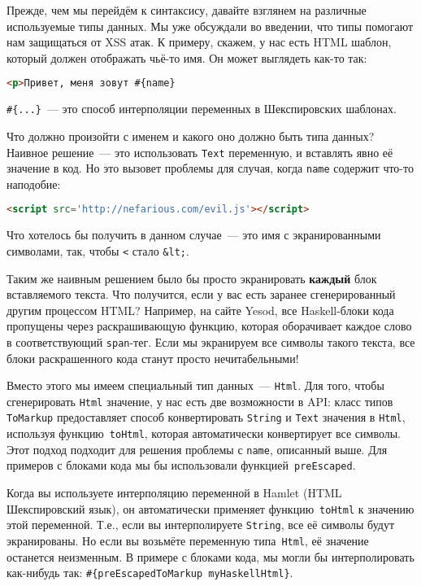 Прежде, чем мы перейдём к синтаксису, давайте взглянем на различные
используемые типы данных. Мы уже обсуждали во введении, что типы помогают нам
защищаться от XSS атак. К примеру, скажем, у нас есть HTML шаблон, который
должен отображать чьё-то имя. Он может выглядеть как-то так:

\begin{lstlisting}[language=HTML]
<p>Привет, меня зовут #{name}
\end{lstlisting}

\begin{remark}
    \lstinline'#{...}'~--- это способ интерполяции переменных в Шекспировских
    шаблонах.
\end{remark}

Что должно произойти с именем и какого оно должно быть типа данных?  Наивное
решение~--- это использовать \lstinline'Text' переменную, и вставлять явно её
значение в код.  Но это вызовет проблемы для случая, когда 
\lstinline'name' содержит что-то наподобие:
\begin{lstlisting}[language=HTML]
<script src='http://nefarious.com/evil.js'></script>
\end{lstlisting}
Что хотелось бы получить в данном случае~--- это имя с экранированными
символами, так, чтобы \lstinline'<' стало \lstinline'&lt;'.

Таким же наивным решением было бы просто экранировать \textbf{каждый} блок
вставляемого текста. Что получится, если у вас есть заранее сгенерированный
другим процессом HTML? Например, на сайте Yesod, все Haskell-блоки кода
пропущены через раскрашивающую функцию, которая оборачивает каждое слово в
соответствующий \texttt{span}-тег. Если мы экранируем все символы такого
текста, все блоки раскрашенного кода станут просто нечитабельными!

Вместо этого мы имеем специальный тип данных~--- \lstinline'Html'. Для того,
чтобы сгенерировать \lstinline'Html' значение, у нас есть две возможности в
API: класс типов \lstinline'ToMarkup' предоставляет способ конвертировать
\lstinline'String' и \lstinline'Text' значения в \lstinline'Html', используя
функцию~\lstinline'toHtml', которая автоматически конвертирует все символы.
Этот подход подходит для решения проблемы с \texttt{name}, описанный выше. Для
примеров с блоками кода мы бы использовали функцией~\lstinline'preEscaped'.

Когда вы используете интерполяцию переменной в Hamlet (HTML Шекспировский
язык), он автоматически применяет функцию~\lstinline'toHtml' к значению этой
переменной. Т.е., если вы интерполируете \lstinline'String', все её символы
будут экранированы. Но если вы возьмёте переменную типа~\lstinline'Html', её
значение останется неизменным. В примере с блоками кода, мы могли бы
интерполировать как-нибудь так: \lstinline'#{preEscapedToMarkup myHaskellHtml}'.

